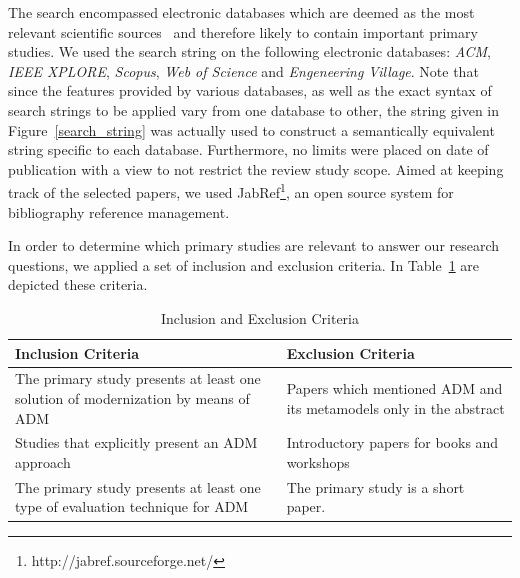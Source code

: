 The search encompassed electronic databases which are deemed as the most relevant scientific sources~\cite{Kitchenham} and therefore likely to contain important primary studies. We used the search string on the following electronic databases: \textit{ACM}, \textit{IEEE XPLORE}, \textit{Scopus}, \textit{Web of Science} and \textit{Engeneering Village}. Note that since the features provided by various databases, as well as the exact syntax of search strings to be applied vary from one database to other, the string given in Figure~\ref{search_string} was actually used to construct a semantically equivalent string specific to each database. Furthermore, no limits were placed on date of publication with a view to not restrict the review study scope. Aimed at keeping track of the selected papers, we used JabRef\footnote{http://jabref.sourceforge.net/}, an open source system for bibliography reference management. 



In order to determine which primary studies are relevant to answer our research questions, we applied a set of inclusion and exclusion criteria. In Table~\ref{tab:inclusion_exclusion_criteria} are depicted these criteria.



\begin{table}
\centering
\caption{Inclusion and Exclusion Criteria\label{tab:inclusion_exclusion_criteria}}
\begin{tabular}{p{}p{}}
\hline 
Inclusion Criteria & Exclusion Criteria\tabularnewline
\hline 
The primary study presents at least one solution of modernization
by means of ADM & Papers which mentioned ADM and its metamodels only in the abstract
\\
Studies that explicitly present an ADM approach & Introductory papers for books and workshops
\\
The primary study presents at least one type of evaluation technique
for ADM & The primary study is a short paper.\tabularnewline
\hline 
\end{tabular}
\end{table}

